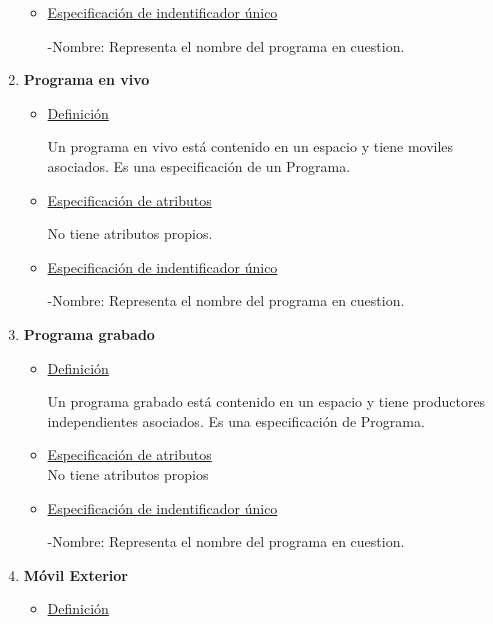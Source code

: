 \documentclass[a4paper,10pt,titlepage]{article}
\begin{document}
\begin{enumerate}
\begin{itemize}
\item \underline{Especificaci\'on de indentificador \'unico}

-Nombre: Representa el nombre del programa en cuestion.

\end{itemize}

\item {\bf Programa en vivo}
\begin{itemize}
 
\item \underline{Definici\'on}

Un programa en vivo est\'a contenido en un espacio y tiene moviles asociados. Es una especificaci\'on de un Programa. 

\item \underline{Especificaci\'on de atributos}

No tiene atributos propios.

\item \underline{Especificaci\'on de indentificador \'unico}

-Nombre: Representa el nombre del programa en cuestion.

\end{itemize}

\item {\bf Programa grabado}
\begin{itemize}
 
\item \underline{Definici\'on}

Un programa grabado est\'a contenido en un espacio y tiene productores independientes asociados. Es una especificaci\'on de Programa. 

\item \underline{Especificaci\'on de atributos}\\
No tiene atributos propios

\item \underline{Especificaci\'on de indentificador \'unico}

-Nombre: Representa el nombre del programa en cuestion.

\end{itemize}

\item {\bf M\'ovil Exterior}

\begin{itemize}
 
\item \underline{Definici\'on}


\end{itemize}
\end{enumerate}
\end{document}
